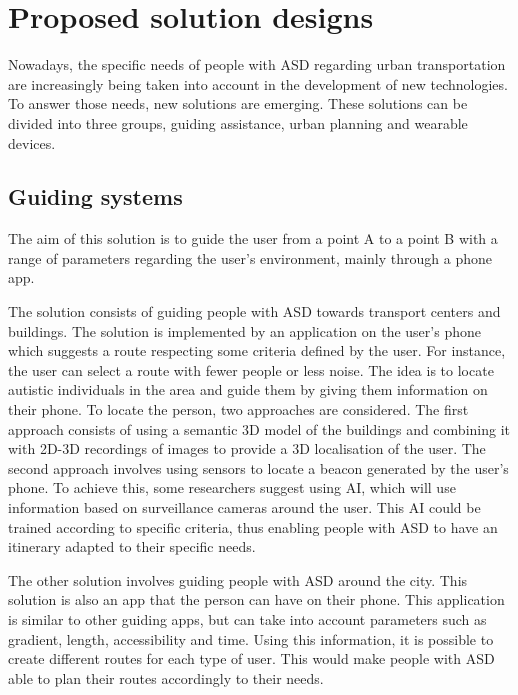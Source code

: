 \section{Proposed solution designs}

Nowadays, the specific needs of people with ASD regarding urban transportation are increasingly being taken into account in the development of new technologies. To answer those needs, new solutions are emerging. These solutions can be divided into three groups, guiding assistance, urban planning and wearable devices.

\subsection{Guiding systems}

The aim of this solution is to guide the user from a point A to a point B with a range of parameters regarding the user's environment, mainly through a phone app\cite{2017BuildingSmartAccessible}\cite{2023AccessibilityStrategiesPromote}. 

The solution consists of guiding people with ASD towards transport centers and buildings\cite{2017BuildingSmartAccessible}. The solution is implemented by an application on the user's phone which suggests a route respecting some criteria defined by the user. For instance, the user can select a route with fewer people or less noise. The idea is to locate autistic individuals in the area and guide them by giving them information on their phone. To locate the person, two approaches are considered. The first approach consists of using a semantic 3D model of the buildings and combining it with 2D-3D recordings of images to provide a 3D localisation of the user. The second approach involves using sensors to locate a beacon generated by the user's phone. To achieve this, some researchers suggest using AI, which will use information based on surveillance cameras around the user\cite{2017BuildingSmartAccessible}. This AI could be trained according to specific criteria, thus enabling people with ASD to have an itinerary adapted to their specific needs.

The other solution involves guiding people with ASD around the city\cite{2023AccessibilityStrategiesPromote}. This solution is also an app that the person can have on their phone. This application is similar to other guiding apps, but can take into account parameters such as gradient, length, accessibility and time. Using this information, it is possible to create different routes for each type of user. This would make people with ASD able to plan their routes accordingly to their needs.

